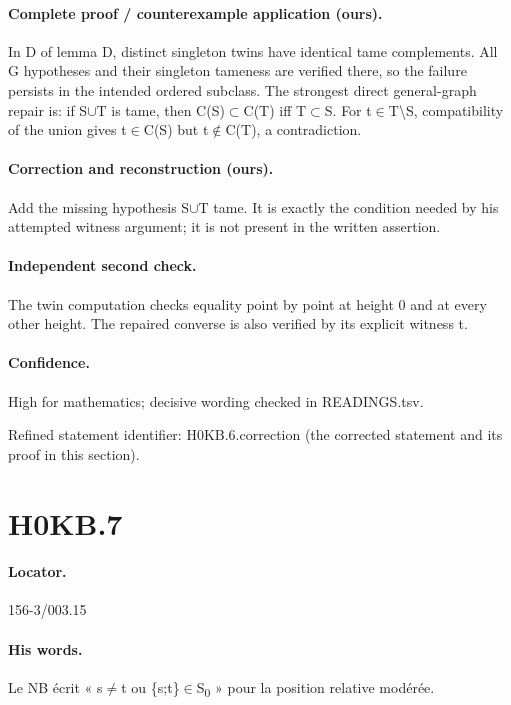 \paragraph{Complete proof / counterexample application (ours).} In D of lemma D, distinct singleton twins have identical tame complements. All G hypotheses and their singleton tameness are verified there, so the failure persists in the intended ordered subclass. The strongest direct general-graph repair is: if S\ensuremath{\cup}T is tame, then C(S)\ensuremath{\subset}C(T) iff T\ensuremath{\subset}S. For t\ensuremath{\in}T\textbackslash{}S, compatibility of the union gives t\ensuremath{\in}C(S) but t\ensuremath{\notin}C(T), a contradiction.

\paragraph{Correction and reconstruction (ours).} Add the missing hypothesis S\ensuremath{\cup}T tame. It is exactly the condition needed by his attempted witness argument; it is not present in the written assertion.

\paragraph{Independent second check.} The twin computation checks equality point by point at height 0 and at every other height. The repaired converse is also verified by its explicit witness t.

\paragraph{Confidence.} High for mathematics; decisive wording checked in READINGS.tsv.

\noindent Refined statement identifier: H0KB.6.correction (the corrected statement and its proof in this section).

\section*{H0KB.7}\label{statement:H0KB.7}
\paragraph{Locator.} 156-3/003.15

\paragraph{His words.} Le NB écrit « s\ensuremath{\ne}t ou \{s;t\}\ensuremath{\in}S\textsubscript{0} » pour la position relative modérée.

